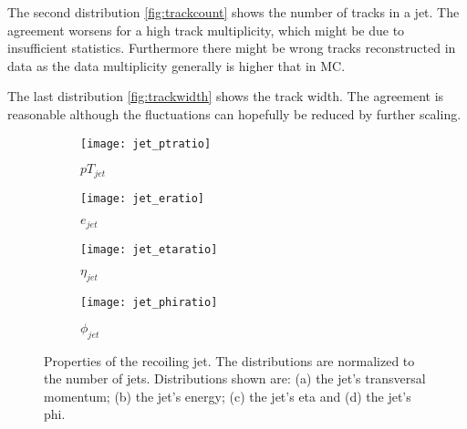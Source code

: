 The second distribution \ref{fig:trackcount} shows the number of tracks in a jet. The agreement worsens for a high track multiplicity, which might be due to insufficient statistics. Furthermore there might be wrong tracks reconstructed in data as the data multiplicity generally is higher that in MC.

The last distribution \ref{fig:trackwidth} shows the track width. The agreement is reasonable although the fluctuations can hopefully be reduced by further scaling.



\begin{figure}[h]
\centering
\begin{subfigure}[b]{0.5\figwidth}
\texttt{[image: jet\_ptratio]}
\caption[Transversal momentum of the recoiling jet]{$pT_{jet}$}
\label{fig:jetpt}
\end{subfigure}
\quad
\begin{subfigure}[b]{0.5\figwidth}
\texttt{[image: jet\_eratio]}
\caption[Energy of the recoiling jet]{$e_{jet}$}
\label{fig:jete}
\end{subfigure}


\begin{subfigure}[b]{0.5\figwidth}
\texttt{[image: jet\_etaratio]}
\caption[$\eta$ of the recoiling jet]{$\eta_{jet}$}
\label{fig:jeteta}
\end{subfigure}
\quad
\begin{subfigure}[b]{0.5\figwidth}
\texttt{[image: jet\_phiratio]}
\caption[$\phi$ of the recoiling jet]{$\phi_{jet}$}
\label{fig:jetphi}
\end{subfigure}
\caption{Properties of the recoiling jet. The distributions are normalized to the number of jets. Distributions shown are: (a) the jet's transversal momentum; (b) the jet's energy; (c) the jet's eta and (d) the jet's phi.}
\label{fig:reoilingjet}
\end{figure}




